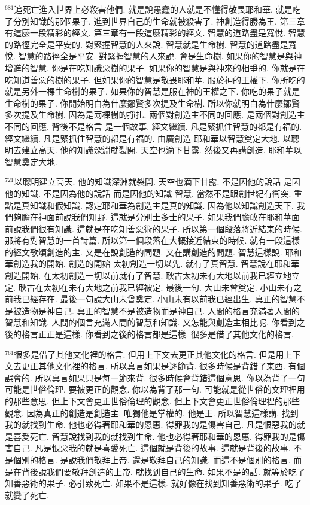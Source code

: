 \documentclass{book}
\begin{document}
$^{681}$追死亡進入世界上必殺害他們.
就是說愚蠢的人就是不懂得敬畏耶和華.
就是吃了分別知識的那個果子.
進到世界自己的生命就被殺害了.
神創造得勝為王.
第三章有這麼一段精彩的經文.
第三章有一段這麼精彩的經文.
智慧的道路盡是寬悅.
智慧的路徑完全是平安的.
對緊握智慧的人來說.
智慧就是生命樹.
智慧的道路盡是寬悅.
智慧的路徑全是平安.
對緊握智慧的人來說.
會是生命樹.
如果你的智慧是與神增進的智慧.
你是在吃知識惡樹的果子.
如果你的智慧是與神來的相爭的.
你就是在吃知道善惡的樹的果子.
但如果你的智慧是敬畏耶和華.
服於神的王權下.
你所吃的就是另外一棵生命樹的果子.
如果你的智慧是服在神的王權之下.
你吃的果子就是生命樹的果子.
你開始明白為什麼鄒賢多次提及生命樹.
所以你就明白為什麼鄒賢多次提及生命樹.
因為是兩棵樹的掙扎.
兩個對創造主不同的回應.
是兩個對創造主不同的回應.
背後不是格言 是一個故事.
經文繼續.
凡是緊抓住智慧的都是有福的.
經文繼續.
凡是緊抓住智慧的都是有福的.
由廣創造 耶和華以智慧奠定大地.
以聰明去建立高天.
他的知識深淵就裂開.
天空也滴下甘露.
然後又再講創造.
耶和華以智慧奠定大地.

$^{721}$以聰明建立高天.
他的知識深淵就裂開.
天空也滴下甘露.
不是因他的說話 是因他的知識.
不是因為他的說話 而是因他的知識 智慧.
當然不是跟創世紀有衝突.
重點是真知識和假知識.
認定耶和華為創造主是真的知識.
因為他以知識創造天下.
我們夠膽在神面前說我們知野.
這就是分別士多士的果子.
如果我們膽敢在耶和華面前說我們很有知識.
這就是在吃知善惡術的果子.
所以第一個段落將近結束的時候.
那將有對智慧的一首詩篇.
所以第一個段落在大概接近結束的時候.
就有一段這樣的經文歌頌創造的主.
又是在說創造的問題.
又在講創造的問題.
智慧這樣說.
耶和華創造我的開始.
創造的開始 太初創造一切以先.
就有了真智慧.
智慧說在耶和華創造開始.
在太初創造一切以前就有了智慧.
耿古太初未有大地以前我已經立地立定.
耿古在太初在未有大地之前我已經被定.
最後一句.
大山未曾奠定.
小山未有之前我已經存在.
最後一句說大山未曾奠定.
小山未有以前我已經出生.
真正的智慧不是被造物是神自己.
真正的智慧不是被造物而是神自己.
人間的格言充滿著人間的智慧和知識.
人間的個言充滿人間的智慧和知識.
又怎能與創造主相比呢.
你看到之後的格言正正是這樣.
你看到之後的格言都是這樣.
很多是借了其他文化的格言.

$^{761}$很多是借了其他文化裡的格言.
但用上下文去更正其他文化的格言.
但是用上下文去更正其他文化裡的格言.
所以真言如果是逐節背.
很多時候是背錯了東西.
有個誤會的.
所以真言如果只是每一節來背.
很多時候會背錯這個意思.
你以為背了一句可能是世俗倫理.
要被更正的觀念.
你以為背了那一句.
可能就是從世俗的文理裡用的那些意思.
但上下文會更正世俗倫理的觀念.
但上下文會更正世俗倫理裡的那些觀念.
因為真正的創造是創造主.
唯獨他是掌權的.
他是王.
所以智慧這樣講.
找到我的就找到生命.
他也必得著耶和華的恩惠.
得罪我的是傷害自己.
凡是恨惡我的就是喜愛死亡.
智慧說找到我的就找到生命.
他也必得著耶和華的恩惠.
得罪我的是傷害自己.
凡是恨惡我的就是喜愛死亡.
這個就是背後的故事.
這就是背後的故事.
不是個別的格言.
是說我們敬拜上帝.
還是敬拜自己的知識.
而這不是個別的格言.
而是在背後說我們要敬拜創造的上帝.
就找到自己的生命.
如果不是的話.
就等於吃了知善惡術的果子.
必引致死亡.
如果不是這樣.
就好像在找到知善惡術的果子.
吃了就變了死亡.
\end{document}
